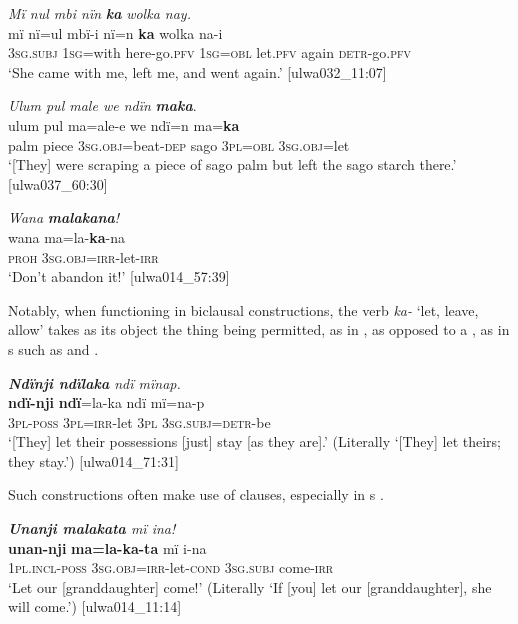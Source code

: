 \ea%
    \label{ex:syntax:370}
          \textit{Mï nul mbi nïn} \textbf{\textit{ka}} \textit{wolka nay.}\\
\gll    mï      nï=ul    mbï-i      nï=n      \textbf{ka}    wolka na-i\\
    3\textsc{sg.subj}  1\textsc{sg}=with  here-go.\textsc{pfv}  1\textsc{sg=obl}   let.\textsc{pfv}    again    \textsc{detr-}go.\textsc{pfv}\\
\glt `She came with me, left me, and went again.’ [ulwa032\_11:07]
\z

\ea%
    \label{ex:syntax:371}
          \textit{Ulum pul male we ndïn} \textbf{\textit{maka}}.\\
\gll ulum  pul    ma=ale-e        we    ndï=n    ma=\textbf{ka}\\
    palm  piece  3\textsc{sg.obj}=beat-\textsc{dep}    sago  3\textsc{pl=obl}  3\textsc{sg.obj}=let\\
\glt `[They] were scraping a piece of sago palm but left the sago starch there.’ [ulwa037\_60:30]
\z

\ea%
    \label{ex:syntax:372}
          \textit{Wana} \textbf{\textit{malakana}}\textit{!}\\
\gll    wana  ma=la-\textbf{ka}{}-na\\
    \textsc{proh}  \textsc{3sg.obj}=\textsc{irr-}let-\textsc{irr}\\
\glt `Don’t abandon it!’ [ulwa014\_57:39]
\z

Notably, when functioning in  biclausal  constructions, the verb \textit{ka-} ‘let, leave, allow’ takes as its object the thing being permitted, as in , as opposed to a , as in s such as  and .

\ea%
    \label{ex:syntax:373}
          \textit{\textbf{Ndïnji ndïlaka} ndï mïnap.}\\
\gll    \textbf{ndï-nji}    \textbf{ndï}=la-ka    ndï  mï=na-p\\
    3\textsc{pl-poss}  3\textsc{pl}=\textsc{irr-}let  \textsc{3pl}  \textsc{3sg.subj=detr-}be\\
\glt `[They] let their possessions [just] stay [as they are].’ (Literally ‘[They] let theirs; they stay.’) [ulwa014\_71:31]
\z

Such constructions often make use of  clauses, especially in s .

\ea%
    \label{ex:syntax:375}
          \textit{\textbf{Unanji malakata} mï ina!}\\
\gll    \textbf{unan-nji}    \textbf{ma=la-ka-ta}      mï      i-na\\
    1\textsc{pl.incl-poss}  \textsc{3sg.obj=irr-}let-\textsc{cond}  3\textsc{sg.subj}  come-\textsc{irr}\\
\glt `Let our [granddaughter] come!’ (Literally ‘If [you] let our [granddaughter], she will come.’) [ulwa014\_11:14]
\z

